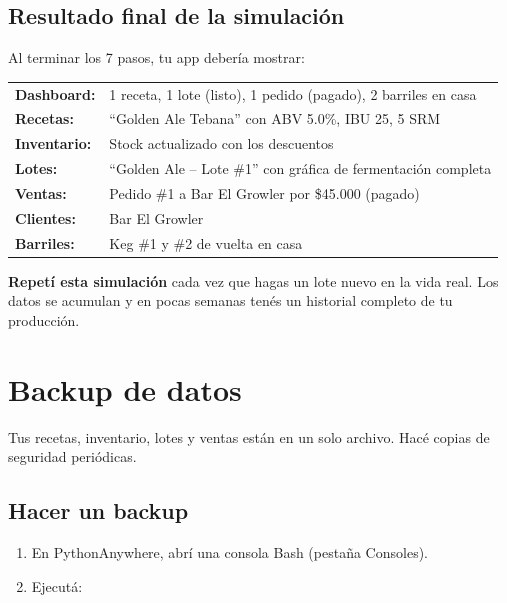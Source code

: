 \documentclass[11pt,a4paper]{report}
\begin{document}
\section{Resultado final de la simulación}

Al terminar los 7 pasos, tu app debería mostrar:

\begin{center}
\begin{tabular}{>{\bfseries}ll}
\toprule
Dashboard: & 1 receta, 1 lote (listo), 1 pedido (pagado), 2 barriles en casa \\
Recetas:   & ``Golden Ale Tebana'' con ABV 5.0\%, IBU 25, 5 SRM \\
Inventario:& Stock actualizado con los descuentos \\
Lotes:     & ``Golden Ale -- Lote \#1'' con gráfica de fermentación completa \\
Ventas:    & Pedido \#1 a Bar El Growler por \$45.000 (pagado) \\
Clientes:  & Bar El Growler \\
Barriles:  & Keg \#1 y \#2 de vuelta en casa \\
\bottomrule
\end{tabular}
\end{center}

\begin{tipbox}
\textbf{Repetí esta simulación} cada vez que hagas un lote nuevo en la vida real. Los datos se acumulan y en pocas semanas tenés un historial completo de tu producción.
\end{tipbox}

\chapter{Backup de datos}

Tus recetas, inventario, lotes y ventas están en un solo archivo. Hacé copias de seguridad periódicas.

\section{Hacer un backup}

\begin{enumerate}[leftmargin=*]
  \item En PythonAnywhere, abrí una consola Bash (pestaña Consoles).
  \item Ejecutá:
\end{enumerate}
\end{document}

